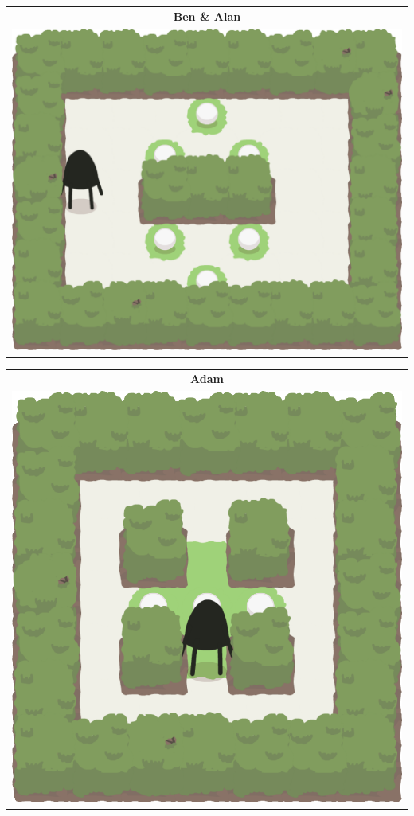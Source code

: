 \documentclass{report}
\theoremstyle{plain}
\begin{document}
\begin{center}
\begin{tabular}{c}
\end{tabular}
\begin{tabular}{c}
\textbf{Ben \& Alan} \\
\includegraphics[scale=\levelAnnexWidth]{ben-alan.png}
\end{tabular}
\begin{tabular}{c}
\textbf{Adam} \\
\includegraphics[scale=\levelAnnexWidth]{adam-1.png}

\end{tabular}
\end{center}
\end{document}

